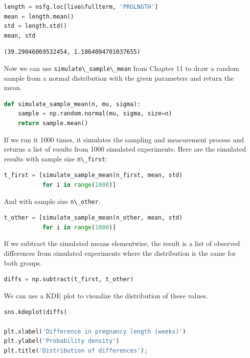 \begin{lstlisting}[language=Python,style=source]
length = nsfg.loc[live&fullterm, 'PRGLNGTH']
mean = length.mean()
std = length.std()
mean, std
\end{lstlisting}

\begin{lstlisting}[style=output]
(39.29046069532454, 1.1864094701037655)
\end{lstlisting}

Now we can use \passthrough{\lstinline!simulate\_sample\_mean!} from
Chapter 11 to draw a random sample from a normal distribution with the
given parameters and return the mean.

\begin{lstlisting}[language=Python,style=source]
def simulate_sample_mean(n, mu, sigma):
    sample = np.random.normal(mu, sigma, size=n)
    return sample.mean()
\end{lstlisting}

If we run it 1000 times, it simulates the sampling and measurement
process and returns a list of results from 1000 simulated experiments.
Here are the simulated results with sample size
\passthrough{\lstinline!n\_first!}:

\begin{lstlisting}[language=Python,style=source]
t_first = [simulate_sample_mean(n_first, mean, std)
           for i in range(1000)]
\end{lstlisting}

And with sample size \passthrough{\lstinline!n\_other!}.

\begin{lstlisting}[language=Python,style=source]
t_other = [simulate_sample_mean(n_other, mean, std)
           for i in range(1000)]
\end{lstlisting}

If we subtract the simulated means elementwise, the result is a list of
observed differences from simulated experiments where the distribution
is the same for both groups.

\begin{lstlisting}[language=Python,style=source]
diffs = np.subtract(t_first, t_other)
\end{lstlisting}

We can use a KDE plot to visualize the distribution of these values.

\begin{lstlisting}[language=Python,style=source]
sns.kdeplot(diffs)

plt.xlabel('Difference in pregnancy length (weeks)')
plt.ylabel('Probability density')
plt.title('Distribution of differences');
\end{lstlisting}

